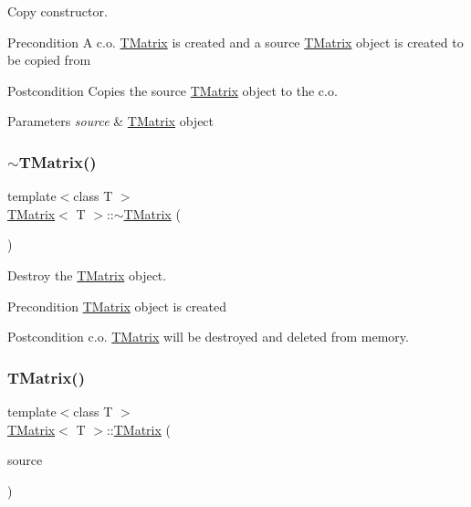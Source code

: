 Copy constructor. 

\begin{DoxyPrecond}{Precondition}
A c.\+o. \mbox{\hyperlink{class_t_matrix}{T\+Matrix}} is created and a source \mbox{\hyperlink{class_t_matrix}{T\+Matrix}} object is created to be copied from 
\end{DoxyPrecond}
\begin{DoxyPostcond}{Postcondition}
Copies the source \mbox{\hyperlink{class_t_matrix}{T\+Matrix}} object to the c.\+o. 
\end{DoxyPostcond}

\begin{DoxyParams}{Parameters}
{\em source} & \mbox{\hyperlink{class_t_matrix}{T\+Matrix}} object \\
\hline
\end{DoxyParams}
\mbox{\label{class_t_matrix_a183cba14a9de95c889fb84870b11da1f}} 
\subsubsection{\texorpdfstring{$\sim$TMatrix()}{~TMatrix()}}
{\footnotesize\ttfamily template$<$class T $>$ \\
\mbox{\hyperlink{class_t_matrix}{T\+Matrix}}$<$ T $>$\+::$\sim$\mbox{\hyperlink{class_t_matrix}{T\+Matrix}} (\begin{DoxyParamCaption}{ }\end{DoxyParamCaption})}



Destroy the \mbox{\hyperlink{class_t_matrix}{T\+Matrix}} object. 

\begin{DoxyPrecond}{Precondition}
\mbox{\hyperlink{class_t_matrix}{T\+Matrix}} object is created 
\end{DoxyPrecond}
\begin{DoxyPostcond}{Postcondition}
c.\+o. \mbox{\hyperlink{class_t_matrix}{T\+Matrix}} will be destroyed and deleted from memory. 
\end{DoxyPostcond}
\mbox{\label{class_t_matrix_ac76352f76eb4ebba385010c2779b6793}} 
\subsubsection{\texorpdfstring{TMatrix()}{TMatrix()}\hspace{0.1cm}{\footnotesize\ttfamily [4/4]}}
{\footnotesize\ttfamily template$<$class T $>$ \\
\mbox{\hyperlink{class_t_matrix}{T\+Matrix}}$<$ T $>$\+::\mbox{\hyperlink{class_t_matrix}{T\+Matrix}} (\begin{DoxyParamCaption}\item[{\mbox{\hyperlink{class_t_matrix}{T\+Matrix}}$<$ T $>$ \&\&}]{source }\end{DoxyParamCaption})}



